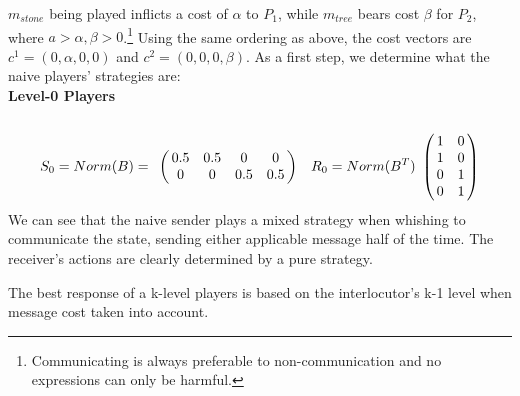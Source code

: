 \documentclass[10pt]{article}
\begin{document}
$m_{stone}$ being played inflicts a cost of $\alpha$ to $P_1$, while $m_{tree}$ bears cost $\beta$ for $P_2$, where $a>\alpha,\beta>0$.\footnote{Communicating is always preferable to non-communication and no expressions can only be harmful.} Using the same ordering as above, the cost vectors are $c^1=(0,\alpha,0,0)$ and $c^2=(0,0,0,\beta)$. As a first step, we determine what the naive players' strategies are:\\
\textbf{Level-0 Players}\\
\begin{equation*}
S_0=Norm(B)=
\bordermatrix{
            & & & &    \cr
 &       0.5 &         0.5 & 0       & 0 \cr
 &       0 &         0 & 0.5       & 0.5
 }\quad
R_0=Norm(B^T)
\bordermatrix{
            &  & \cr
    & 1 & 0 \cr
     & 1 & 0 \cr
     & 0 & 1 \cr
     & 0 & 1 \cr
 }
\end{equation*}
We can see that the naive sender plays a mixed strategy when whishing to communicate the state, sending either applicable message half of the time. The receiver's actions are clearly determined by a pure strategy.

The best response of a k-level players is based on the interlocutor's k-1 level when message cost taken into account.
\end{document}
